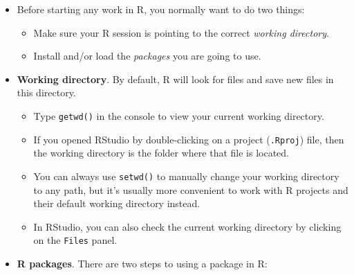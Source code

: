 \documentclass[
]{book}
\providecommand{\tightlist}{%
  \setlength{\itemsep}{0pt}\setlength{\parskip}{0pt}}
\begin{document}
\begin{itemize}
\tightlist
\item
  Before starting any work in R, you normally want to do two things:

  \begin{itemize}
  \tightlist
  \item
    Make sure your R session is pointing to the correct \emph{working directory}.
  \item
    Install and/or load the \emph{packages} you are going to use.
  \end{itemize}
\item
  \textbf{Working directory}. By default, R will look for files and save new files in this directory.

  \begin{itemize}
  \tightlist
  \item
    Type \texttt{getwd()} in the console to view your current working directory.
  \item
    If you opened RStudio by double-clicking on a project (\texttt{.Rproj}) file, then the working directory is the folder where that file is located.
  \item
    You can always use \texttt{setwd()} to manually change your working directory to any path, but it's usually more convenient to work with R projects and their default working directory instead.
  \item
    In RStudio, you can also check the current working directory by clicking on the \texttt{Files} panel.
  \end{itemize}
\item
  \textbf{R packages}. There are two steps to using a package in R:


\end{itemize}
\end{document}
